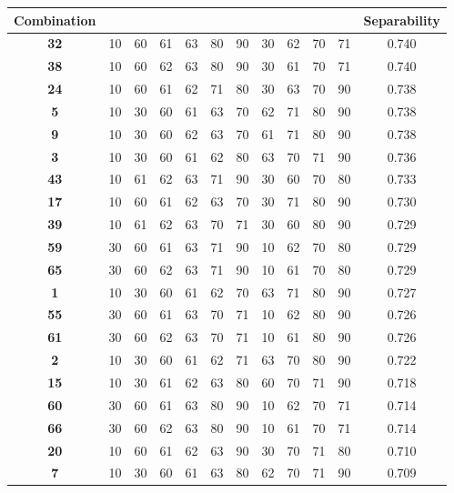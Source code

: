 \newpage
\begin{table}
\centering
\begin{tabular}{|c|c|c|c|c|c|c|c|c|c|c|c|}

\hline
Combination &  &  &  &  &  &  &  &  &  &  & Separability \\
\hline
\textbf{32} & 10 & 60 & 61 & 63 & 80 & 90 & 30 & 62 & 70 & 71 & 0.740 \\
\hline
\textbf{38} & 10 & 60 & 62 & 63 & 80 & 90 & 30 & 61 & 70 & 71 & 0.740 \\
\hline
\textbf{24} & 10 & 60 & 61 & 62 & 71 & 80 & 30 & 63 & 70 & 90 & 0.738 \\
\hline
\textbf{5} & 10 & 30 & 60 & 61 & 63 & 70 & 62 & 71 & 80 & 90 & 0.738 \\
\hline
\textbf{9} & 10 & 30 & 60 & 62 & 63 & 70 & 61 & 71 & 80 & 90 & 0.738 \\
\hline
\textbf{3} & 10 & 30 & 60 & 61 & 62 & 80 & 63 & 70 & 71 & 90 & 0.736 \\
\hline
\textbf{43} & 10 & 61 & 62 & 63 & 71 & 90 & 30 & 60 & 70 & 80 & 0.733 \\
\hline
\textbf{17} & 10 & 60 & 61 & 62 & 63 & 70 & 30 & 71 & 80 & 90 & 0.730 \\
\hline
\textbf{39} & 10 & 61 & 62 & 63 & 70 & 71 & 30 & 60 & 80 & 90 & 0.729 \\
\hline
\textbf{59} & 30 & 60 & 61 & 63 & 71 & 90 & 10 & 62 & 70 & 80 & 0.729 \\
\hline
\textbf{65} & 30 & 60 & 62 & 63 & 71 & 90 & 10 & 61 & 70 & 80 & 0.729 \\
\hline
\textbf{1} & 10 & 30 & 60 & 61 & 62 & 70 & 63 & 71 & 80 & 90 & 0.727 \\
\hline
\textbf{55} & 30 & 60 & 61 & 63 & 70 & 71 & 10 & 62 & 80 & 90 & 0.726 \\
\hline
\textbf{61} & 30 & 60 & 62 & 63 & 70 & 71 & 10 & 61 & 80 & 90 & 0.726 \\
\hline
\textbf{2} & 10 & 30 & 60 & 61 & 62 & 71 & 63 & 70 & 80 & 90 & 0.722 \\
\hline
\textbf{15} & 10 & 30 & 61 & 62 & 63 & 80 & 60 & 70 & 71 & 90 & 0.718 \\
\hline
\textbf{60} & 30 & 60 & 61 & 63 & 80 & 90 & 10 & 62 & 70 & 71 & 0.714 \\
\hline
\textbf{66} & 30 & 60 & 62 & 63 & 80 & 90 & 10 & 61 & 70 & 71 & 0.714 \\
\hline
\textbf{20} & 10 & 60 & 61 & 62 & 63 & 90 & 30 & 70 & 71 & 80 & 0.710 \\
\hline
\textbf{7} & 10 & 30 & 60 & 61 & 63 & 80 & 62 & 70 & 71 & 90 & 0.709 \\

\end{tabular}
\end{table}
